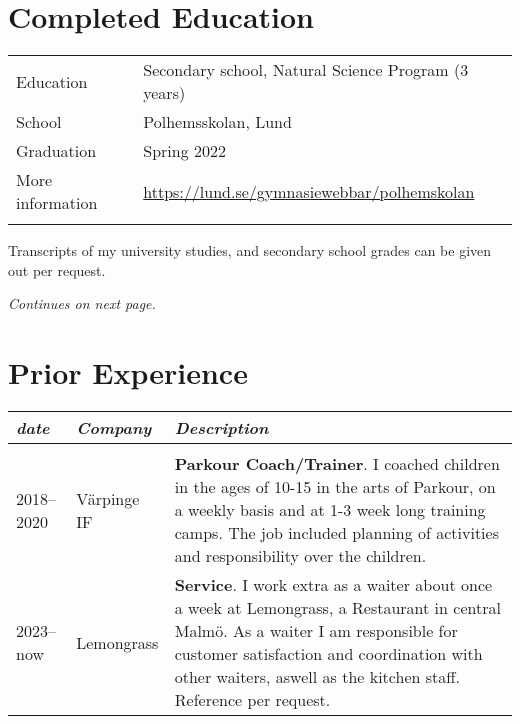 \documentclass{cv}
\begin{document}
\section{Completed Education}
\begin{tabular*}{\textwidth}{p{5cm} l}
	Education        & Secondary school, Natural Science Program (3 years) \\
	School           & Polhemsskolan, Lund \\
	Graduation       & Spring 2022 \\
	More information & \url{https://lund.se/gymnasiewebbar/polhemskolan}\\ \\
\end{tabular*}

\vspace{1em} Transcripts of my university studies, and secondary school grades can be given out per request.

\vspace{2em}\hfill\textit{Continues on next page.}
\newpage
\section{Prior Experience}

\begin{tabular*}{\textwidth}{p{3.4cm}   p{3.5cm}  p{11cm}  }
	\textit{date}  & \textit{Company}  & \textit{Description} \\ \hline \\

	2018--2020 & Värpinge IF & \textbf{Parkour Coach/Trainer}. I coached children in the ages of 10-15 in the arts of Parkour, on a weekly basis and at 1-3 week long training camps. The job included planning of activities and responsibility over the children.\\

	2023--now & Lemongrass & \textbf{Service}. I work extra as a waiter about once a week at Lemongrass, a Restaurant in central Malmö. As a waiter I am responsible for customer satisfaction and coordination with other waiters, aswell as the kitchen staff. Reference per request.

\end{tabular*}
\end{document}
